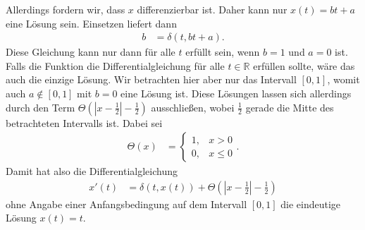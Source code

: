 \documentclass[english, parskip=full]{scrartcl}
\begin{document}
Allerdings fordern wir, dass $x$ differenzierbar ist.
Daher kann nur $x(t) = bt+a$ eine Lösung sein.
Einsetzen liefert dann
\begin{align}
b &= \delta(t, bt+a).
\end{align}
Diese Gleichung kann nur dann für alle $t$ erfüllt sein, wenn $b=1$ und $a=0$ ist.
Falls die Funktion die Differentialgleichung für alle $t\in\mathbb{R}$ erfüllen sollte, wäre das auch die einzige Lösung. 
Wir betrachten hier aber nur das Intervall $[0,1]$, womit auch $a \notin [0,1]$ mit $b=0$ eine Lösung ist.
Diese Lösungen lassen sich allerdings durch den Term $\Theta\left( \left\vert x-\frac{1}{2}\right\vert - \frac{1}{2} \right)$ ausschließen, wobei $\frac{1}{2}$ gerade die Mitte des betrachteten Intervalls ist.
Dabei sei
\begin{align}
\Theta(x) &=\begin{cases} 1,&x> 0 \\ 0,&x\le 0 \end{cases}.
\end{align}
Damit hat also die Differentialgleichung
\begin{align}
x'(t) &= \delta(t,x(t)) + \Theta\left( \left\vert x-\frac{1}{2}\right\vert - \frac{1}{2} \right)
\end{align}
ohne Angabe einer Anfangsbedingung auf dem Intervall $[0,1]$ die eindeutige Lösung $x(t)=t$.
\end{document}
